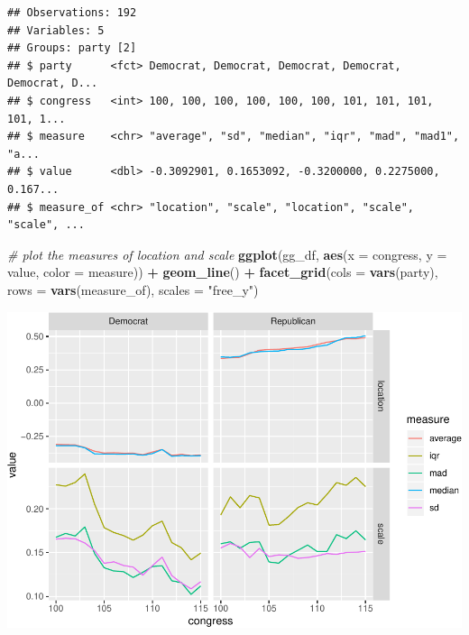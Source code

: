 \documentclass[]{book}
\newenvironment{Shaded}{\begin{snugshade}}{\end{snugshade}}
\newcommand{\CommentTok}[1]{\textcolor[rgb]{0.56,0.35,0.01}{\textit{#1}}}
\newcommand{\DataTypeTok}[1]{\textcolor[rgb]{0.13,0.29,0.53}{#1}}
\newcommand{\KeywordTok}[1]{\textcolor[rgb]{0.13,0.29,0.53}{\textbf{#1}}}
\newcommand{\NormalTok}[1]{#1}
\newcommand{\OperatorTok}[1]{\textcolor[rgb]{0.81,0.36,0.00}{\textbf{#1}}}
\newcommand{\StringTok}[1]{\textcolor[rgb]{0.31,0.60,0.02}{#1}}
\begin{document}
\begin{Shaded}
\end{Shaded}

\begin{verbatim}
## Observations: 192
## Variables: 5
## Groups: party [2]
## $ party      <fct> Democrat, Democrat, Democrat, Democrat, Democrat, D...
## $ congress   <int> 100, 100, 100, 100, 100, 100, 101, 101, 101, 101, 1...
## $ measure    <chr> "average", "sd", "median", "iqr", "mad", "mad1", "a...
## $ value      <dbl> -0.3092901, 0.1653092, -0.3200000, 0.2275000, 0.167...
## $ measure_of <chr> "location", "scale", "location", "scale", "scale", ...
\end{verbatim}

\begin{Shaded}
\begin{Highlighting}[]
\CommentTok{# plot the measures of location and scale}
\KeywordTok{ggplot}\NormalTok{(gg_df, }\KeywordTok{aes}\NormalTok{(}\DataTypeTok{x =}\NormalTok{ congress, }\DataTypeTok{y =}\NormalTok{ value, }\DataTypeTok{color =}\NormalTok{ measure)) }\OperatorTok{+}\StringTok{ }
\StringTok{  }\KeywordTok{geom_line}\NormalTok{() }\OperatorTok{+}\StringTok{ }
\StringTok{  }\KeywordTok{facet_grid}\NormalTok{(}\DataTypeTok{cols =} \KeywordTok{vars}\NormalTok{(party), }\DataTypeTok{rows =} \KeywordTok{vars}\NormalTok{(measure_of), }\DataTypeTok{scales =} \StringTok{"free_y"}\NormalTok{)}
\end{Highlighting}
\end{Shaded}

\includegraphics{concepts-and-computation_files/figure-latex/unnamed-chunk-13-1.pdf}


\end{document}
